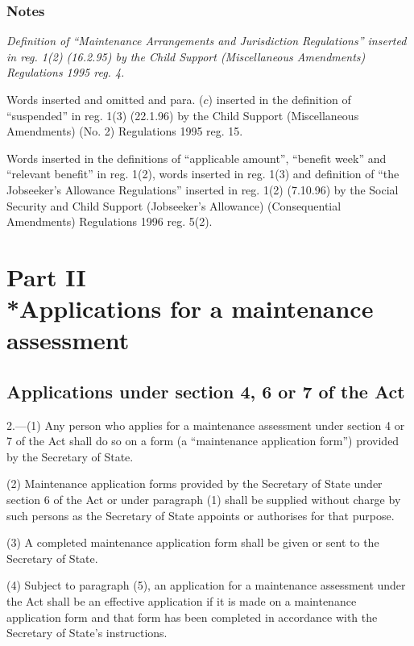 \documentclass[a4paper]{article}
\newcommand{\parthead}{}
\newcommand\amendment[1]{\subsubsection*{Notes}{\itshape\frenchspacing\footnotesize #1 \par}}
\begin{document}
\amendment{
Definition of ``Maintenance Arrangements and Jurisdiction Regulations'' inserted in reg. 1(2) (16.2.95) by the Child Support (Miscellaneous Amendments) Regulations 1995 reg. 4.

Words inserted and omitted and para. ($c$) inserted in the definition of ``suspended'' in reg. 1(3) (22.1.96) by the Child Support (Miscellaneous Amendments) (No. 2) Regulations 1995 reg. 15.

Words inserted in the definitions of ``applicable amount'', ``benefit week'' and ``relevant benefit'' in reg. 1(2), words inserted in reg. 1(3) and definition of ``the Jobseeker's Allowance Regulations'' inserted in reg. 1(2) (7.10.96) by the Social Security and Child Support (Jobseeker's Allowance) (Consequential Amendments) Regulations 1996 reg. 5(2).
}

\section[Part II --- Applications for a maintenance assessment]{Part II\\*Applications for a maintenance assessment}

\renewcommand\parthead{--- Part II}

\subsection[2. Applications under section 4, 6 or 7 of the Act]{Applications under section 4, 6 or 7 of the Act}

2.—(1) Any person who applies for a maintenance assessment under section 4 or 7 of the Act shall do so on a form (a “maintenance application form”) provided by the Secretary of State.

(2) Maintenance application forms provided by the Secretary of State under section 6 of the Act or under paragraph (1) shall be supplied without charge by such persons as the Secretary of State appoints or authorises for that purpose.

(3) A completed maintenance application form shall be given or sent to the Secretary of State.

(4) Subject to paragraph (5), an application for a maintenance assessment under the Act shall be an effective application if it is made on a maintenance application form and that form has been completed in accordance with the Secretary of State’s instructions.
\end{document}
